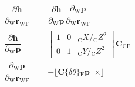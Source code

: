 \documentclass{article}
\renewcommand{\Vec}[1]{{\mathbf{#1}}}
\newcommand{\Mat}[1]{{\mathbf{#1}}}
\newcommand{\Skew}[1]{{\lfloor #1 \enspace \times \rfloor}}
\newcommand{\cam}{{\text{C}}}
\newcommand{\world}{{\text{W}}}
\newcommand{\fiducial}{{\text{F}}}
\newcommand{\KineNotationTransform}[3]{{{#1}_{#2#3}}}
\newcommand{\KineNotation}[3]{{{{}_{#2}} {#1}_{#2#3}}}
\newcommand{\KineNotationPart}[3]{{{{}_{#2}} {#1}_{#3}}}
\newcommand{\KineNotationBare}[2]{{{{}_{#2}} {#1}}}
\newcommand{\pos}{{\Vec{r}}}
\newcommand{\Pos}[2]{{\KineNotation{\pos}{#1}{#2}}}
\newcommand{\rot}{{\Mat{C}}}
\newcommand{\Rot}[2]{{\KineNotationTransform{\rot}{#1}{#2}}}
\newcommand{\point}{\Vec{p}}
\newcommand{\Pt}[1]{{\KineNotationPart{\point}{#1}{}}}
\newcommand{\projFunc}{{\Vec{h}}}
\begin{document}
\begin{align}
  \dfrac{\partial{\projFunc}}{\partial{\Pos{\world}{\fiducial}}}
  &=
  \dfrac{\partial{\projFunc}}{\partial{\Pt{\world}}}
  \dfrac{\partial{\Pt{\world}}}{\partial{\Pos{\world}{\fiducial}}} \\
  \dfrac{\partial{\projFunc}}{\partial{\Pt{\world}}}
  &=
  \begin{bmatrix}
    1 & 0 & \KineNotationBare{X}{\cam} / \KineNotationBare{Z}{\cam}^{2} \\
    0 & 1 & \KineNotationBare{Y}{\cam} / \KineNotationBare{Z}{\cam}^{2}
  \end{bmatrix}
  \Rot{\cam}{\fiducial} \\
  \dfrac{\partial{\Pt{\world}}}{\partial{\Pos{\world}{\fiducial}}}
  &=
  -\Skew{\rot\{\delta \theta\} \Pt{\fiducial}}
\end{align}




\newpage


\end{document}
